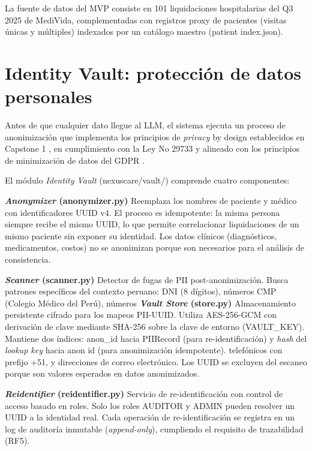 La fuente de datos del MVP consiste en 101 liquidaciones hospitalarias del Q3 2025 de MediVida, complementadas con registros proxy de pacientes (visitas únicas y múltiples) indexados por un catálogo maestro (patient index.json).

\section{Identity Vault: protección de datos personales}

Antes de que cualquier dato llegue al LLM, el sistema ejecuta un proceso de anonimización que implementa los principios de \textit{privacy} by design establecidos en Capstone 1 \cite{hurtado2025nexuscare}, en cumplimiento con la Ley No 29733 \cite{peru2011ley29733} y alineado con los principios de minimización de datos del GDPR \cite{eu2024aiact}.

El módulo \textit{Identity Vault} (nexuscare/vault/) comprende cuatro componentes:

 \textbf{\textit{Anonymizer} (anonymizer.py)} Reemplaza los nombres de paciente y médico con identificadores UUID v4. El proceso es idempotente: la misma persona siempre recibe el mismo UUID, lo que permite correlacionar liquidaciones de un mismo paciente sin exponer su identidad. Los datos clínicos (diagnósticos, medicamentos, costos) no se anonimizan porque son necesarios para el análisis de consistencia.

 
 \textbf{\textit{Scanner} (scanner.py)} Detector de fugas de PII post-anonimización. Busca patrones específicos del contexto peruano: DNI (8 dígitos), números CMP (Colegio Médico del Perú), números
 \textbf{\textit{Vault Store} (store.py)} Almacenamiento persistente cifrado para los mapeos PII-UUID. Utiliza AES-256-GCM con derivación de clave mediante SHA-256 sobre la clave de entorno (VAULT\_KEY). Mantiene dos índices: anon\_id hacia PIIRecord (para re-identificación) y \textit{hash} del \textit{lookup key} hacia anon id (para anonimización idempotente).
telefónicos con prefijo +51, y direcciones de correo electrónico. Los UUID se excluyen del escaneo porque son valores esperados en datos anonimizados.

\textbf{\textit{Reidentifier} (reidentifier.py)} Servicio de re-identificación con control de acceso basado en roles. Solo los roles AUDITOR y ADMIN pueden resolver un UUID a la identidad real. Cada operación de re-identificación se registra en un log de auditoría inmutable (\textit{append-only}), cumpliendo el requisito de trazabilidad (RF5).

